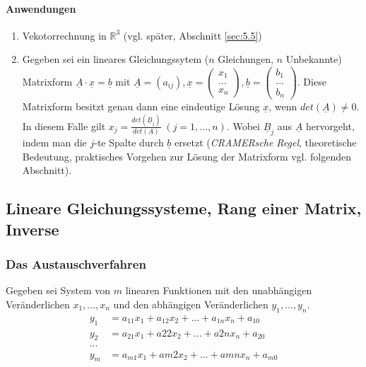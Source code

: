 \paragraph{Anwendungen}
\begin{enumerate}
\item Vekotorrechnung in $\mathbb{R}^3$ (vgl. später, Abschnitt \ref{sec:5.5})
\item Gegeben sei ein lineares Gleichungssytem ($n$ Gleichungen, $n$ Unbekannte)\\
Matrixform $\boxed{\underline{A}\cdot \underline{x}=\underline{b}}$ mit $\underline{A}=(a_{ij}), \underline{x}=\begin{pmatrix}
x_1\\
...\\
x_n
\end{pmatrix}, \underline{b}=\begin{pmatrix}
b_1\\
...\\
b_n
\end{pmatrix}$. Diese Matrixform besitzt genau dann eine eindeutige Lösung $\underline{x}$, wenn $det(\underline{A})\not = 0$. \\
In diesem Falle gilt $\boxed{x_j=\frac{det(\underline{B}_j)}{det(\underline{A})}}\; (j=1,...,n)$. Wobei $\underline{B}_j$ aus $\underline{A}$ hervorgeht, indem man die $j$-te Spalte durch $\underline{b}$ ersetzt (\emph{CRAMERsche Regel}, theoretische Bedeutung, praktisches Vorgehen zur Lösung der Matrixform vgl. folgenden Abschnitt).
\end{enumerate}

\subsection{Lineare Gleichungssysteme, Rang einer Matrix, Inverse}
\subsubsection{Das Austauschverfahren}
Gegeben sei System von $m$ linearen Funktionen mit den unabhängigen Veränderlichen $x_1,...,x_n$ und den abhängigen Veränderlichen $y_1,...,y_n$.
\begin{align*}
y_1&= a_{11}x_{1}+a_{12}x_{2}+...+a_{1n}x_{n}+a_{10}\\
y_2&= a_{21}x_{1}+a{22}x_{2}+...+a{2n}x_{n}+a_{20}\\
...\\
y_m&=a_{m1}x_{1}+a{m2}x_{2}+...+a{mn}x_{n}+a_{m0}
\end{align*}

